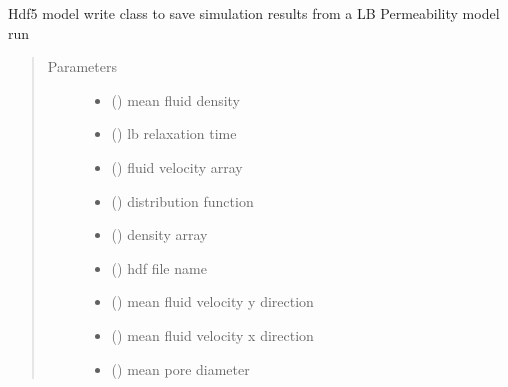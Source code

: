 \documentclass[letterpaper,10pt,english]{sphinxmanual}
\begin{document}
\begin{fulllineitems}
\label{\detokenize{index:lb_colloids.LB.LB_2Dpermeability.HDF5_write}}
Hdf5 model write class to save simulation results from a LB Permeability model run
\begin{quote}\begin{description}
\item[{Parameters}] \leavevmode\begin{itemize}
\item {} 
 () \textendash{} mean fluid density

\item {} 
 () \textendash{} lb relaxation time

\item {} 
 () \textendash{} fluid velocity array

\item {} 
 () \textendash{} distribution function

\item {} 
 () \textendash{} density array

\item {} 
 () \textendash{} hdf file name

\item {} 
 () \textendash{} mean fluid velocity y direction

\item {} 
 () \textendash{} mean fluid velocity x direction

\item {} 
 () \textendash{} mean pore diameter


\end{itemize}
\end{description}
\end{quote}
\end{fulllineitems}
\end{document}

